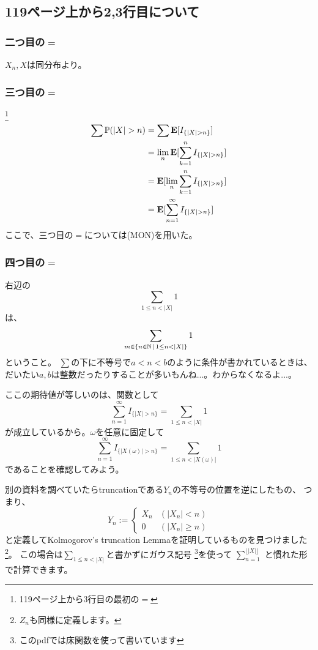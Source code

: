   \subsection{119ページ上から2,3行目について}
    \subsubsection{二つ目の$=$}
      $X_n,X$は同分布より。
    \subsubsection{三つ目の$=$}\footnote{119ページ上から3行目の最初の$=$}
      \begin{align*}
        \sum {\mathbb{P}}(|X| > n) &= \sum {\mathbf{E}}[I_{\{|X| > n\}}] \\
        &= \lim_n {\mathbf{E}}[\sum_{k =1}^n I_{\{|X| > n\}}] \\
        &= {\mathbf{E}}[\lim_n \sum_{k =1}^n I_{\{|X| > n\}}] \\
        &= {\mathbf{E}}[\sum_{n =1}^{\infty} I_{\{|X| > n\}}]
      \end{align*}
      ここで、三つ目の$=$については(MON)を用いた。
    \subsubsection{四つ目の$=$}
      右辺の
      \[
        \sum_{1 \leq n < |X|}1
      \]
      は、
      \[
        \sum_{m \in \{n \in {\mathbb{N}} \, \mid \, 1 \leq n < |X|\}}1
      \]
      ということ。
      $\sum$の下に不等号で$a<n<b$のように条件が書かれているときは、
      だいたい$a,b$は整数だったりすることが多いもんね...。わからなくなるよ...。

      ここの期待値が等しいのは、関数として
      \[
        \sum_{n =1}^{\infty} I_{\{|X| > n\}} = \sum_{1 \leq n < |X|}1
      \]
      が成立しているから。$\omega$を任意に固定して
      \[
        \sum_{n =1}^{\infty} I_{\{|X(\omega)| > n\}} = \sum_{1 \leq n < |X(\omega)|}1
      \]
      であることを確認してみよう。

      別の資料を調べていたらtruncationである$Y_n$の不等号の位置を逆にしたもの、
      つまり、
      \[
        Y_n := \begin{cases}
          X_n & (|X_n| < n)\\
          0 & (|X_n| \ge n)
      \end{cases}
      \]
      と定義してKolmogorov's truncation Lemmaを証明しているものを見つけました
      \footnote{$Z_n$も同様に定義します。}。
      この場合は$\displaystyle{\sum_{1 \leq n < |X|}}$と書かずにガウス記号
      \footnote{このpdfでは床関数を使って書いています}を使って
      $\displaystyle{\sum_{n = 1}^{\lfloor |X| \rfloor}}$
      と慣れた形で計算できます。

